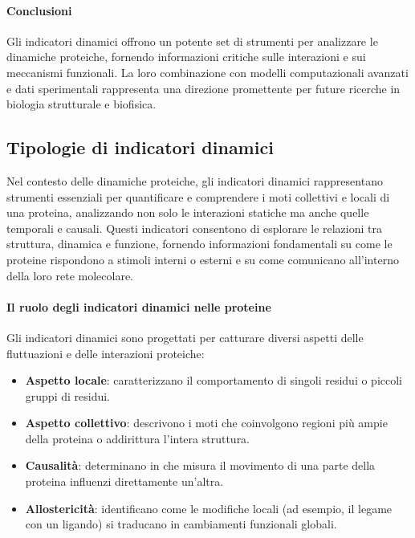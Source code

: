 \documentclass[Lau,binding=0.6cm,oneside,noexaminfo]{sapthesis}
\begin{document}
\paragraph{Conclusioni}
Gli indicatori dinamici offrono un potente set di strumenti per analizzare le dinamiche proteiche, fornendo informazioni critiche sulle interazioni e sui meccanismi funzionali. La loro combinazione con modelli computazionali avanzati e dati sperimentali rappresenta una direzione promettente per future ricerche in biologia strutturale e biofisica.






\subsection{Tipologie di indicatori dinamici}

Nel contesto delle dinamiche proteiche, gli indicatori dinamici rappresentano strumenti essenziali per quantificare e comprendere i moti collettivi e locali di una proteina, analizzando non solo le interazioni statiche ma anche quelle temporali e causali. Questi indicatori consentono di esplorare le relazioni tra struttura, dinamica e funzione, fornendo informazioni fondamentali su come le proteine rispondono a stimoli interni o esterni e su come comunicano all'interno della loro rete molecolare.

\paragraph{Il ruolo degli indicatori dinamici nelle proteine}
Gli indicatori dinamici sono progettati per catturare diversi aspetti delle fluttuazioni e delle interazioni proteiche:
\begin{itemize}
    \item \textbf{Aspetto locale}: caratterizzano il comportamento di singoli residui o piccoli gruppi di residui.
    \item \textbf{Aspetto collettivo}: descrivono i moti che coinvolgono regioni più ampie della proteina o addirittura l'intera struttura.
    \item \textbf{Causalità}: determinano in che misura il movimento di una parte della proteina influenzi direttamente un'altra.
    \item \textbf{Allostericità}: identificano come le modifiche locali (ad esempio, il legame con un ligando) si traducano in cambiamenti funzionali globali.
\end{itemize}
\end{document}
